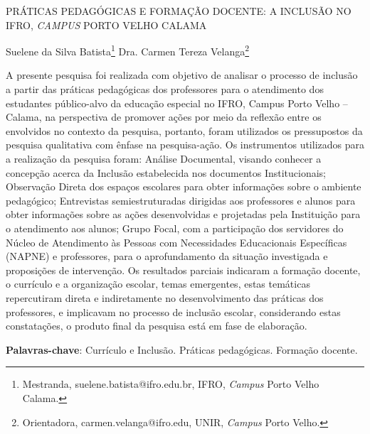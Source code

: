 \documentclass[article,12pt,onesidea,4paper,english,brazil]{abntex2}
\begin{document}
	
	
	\frenchspacing 
	
	\begin{center}
		\LARGE PRÁTICAS PEDAGÓGICAS E FORMAÇÃO DOCENTE: A INCLUSÃO NO IFRO, \textit{CAMPUS} PORTO VELHO CALAMA
		
		\normalsize
		Suelene da Silva Batista\footnote{Mestranda, suelene.batista@ifro.edu.br, IFRO, \textit{Campus} Porto Velho Calama.} 
		Dra. Carmen Tereza Velanga\footnote{Orientadora, carmen.velanga@ifro.edu, UNIR, \textit{Campus} Porto Velho.} 
	\end{center}
	
	\noindent A presente pesquisa foi realizada com objetivo de analisar o processo de inclusão a
	partir das práticas pedagógicas dos professores para o atendimento dos estudantes
	público-alvo da educação especial no IFRO, Campus Porto Velho – Calama, na
	perspectiva de promover ações por meio da reflexão entre os envolvidos no contexto
	da pesquisa, portanto, foram utilizados os pressupostos da pesquisa qualitativa com
	ênfase na pesquisa-ação. Os instrumentos utilizados para a realização da pesquisa
	foram: Análise Documental, visando conhecer a concepção acerca da Inclusão
	estabelecida nos documentos Institucionais; Observação Direta dos espaços
	escolares para obter informações sobre o ambiente pedagógico; Entrevistas
	semiestruturadas dirigidas aos professores e alunos para obter informações sobre
	as ações desenvolvidas e projetadas pela Instituição para o atendimento aos alunos;
	Grupo Focal, com a participação dos servidores do Núcleo de Atendimento às
	Pessoas com Necessidades Educacionais Específicas (NAPNE) e professores, para
	o aprofundamento da situação investigada e proposições de intervenção. Os
	resultados parciais indicaram a formação docente, o currículo e a organização
	escolar, temas emergentes, estas temáticas repercutiram direta e indiretamente no
	desenvolvimento das práticas dos professores, e implicavam no processo de
	inclusão escolar, considerando estas constatações, o produto final da pesquisa está
	em fase de elaboração.
	
	\vspace{\onelineskip}
	
	\noindent
	\textbf{Palavras-chave}: Currículo e Inclusão. Práticas pedagógicas. Formação docente.
	
\end{document}
